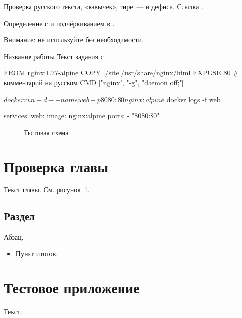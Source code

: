\documentclass[11pt,a4paper,oneside]{book}
\begin{document}
\frontmatter
{}
Проверка русского текста, «кавычек», тире~--- и дефиса. Ссылка .

\begin{defbox}
Определение с  и подчёркиванием в .
\end{defbox}

\begin{warnbox}
Внимание: не используйте  без необходимости.
\end{warnbox}

\begin{labbox}{Название работы}
Текст задания с .
\end{labbox}

\begin{code}[listing options={language=dockerfile}]
FROM nginx:1.27-alpine
COPY ./site /usr/share/nginx/html
EXPOSE 80
# комментарий на русском
CMD ["nginx", "-g", "daemon off;"]
\end{code}

\begin{code}[listing options={language=bash}]
$ docker run -d --name web -p 8080:80 nginx:alpine
$ docker logs -f web
\end{code}

\begin{code}[listing options={language=composeyaml}]
services:
  web:
    image: nginx:alpine
    ports:
      - "8080:80"
\end{code}

\begin{figure}[htbp]
\centering
{}
\caption{Тестовая схема}\label{fig:test}
\end{figure}

\mainmatter
\chapter{Проверка главы}
Текст главы. См. рисунок~\ref{fig:test}.

\section{Раздел}
Абзац.

\begin{summarybox}
\begin{itemize}
\item Пункт итогов.
\end{itemize}
\end{summarybox}

\appendix
\renewcommand{\chaptertitlename}{Приложение}
\chapter{Тестовое приложение}
Текст.

\backmatter
\end{document}
